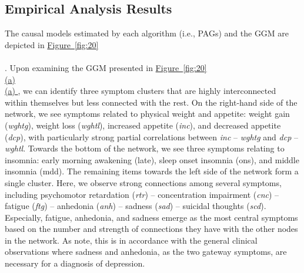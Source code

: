 \documentclass[twoside, 11pt]{article}
\newcommand*{\figref}[2][]{%
  \hyperref[{fig:#2}]{%
    Figure~\ref*{fig:#2}%
    \ifx\\#1\\%
    \else
      #1%
    \fi
  }%
}
\begin{document}
\subsection{Empirical Analysis Results} \label{empiricalresult}
The causal models estimated by each algorithm (i.e., PAGs) and the GGM are depicted in \figref[]{20}. Upon examining the GGM presented in \figref[(a)]{20}, we can identify three symptom clusters that are highly interconnected within themselves but less connected with the rest. On the right-hand side of the network, we see symptoms related to physical weight and appetite: weight gain (\textit{wghtg}), weight loss (\textit{wghtl}), increased appetite (\textit{inc}), and decreased appetite (\textit{dcp}), with particularly strong partial correlations between \textit{inc} -- \textit{wghtg} and \textit{dcp} -- \textit{wghtl}. Towards the bottom of the network, we see three symptoms relating to insomnia: early morning awakening (late), sleep onset insomnia (ons), and middle insomnia (mdd). The remaining items towards the left side of the network form a single cluster. Here, we observe strong connections among several symptoms, including psychomotor retardation (\textit{rtr}) -- concentration impairment (\textit{cnc}) -- fatigue (\textit{ftg}) -- anhedonia (\textit{anh}) -- sadness (\textit{sad}) -- suicidal thoughts (\textit{scd}). Especially, fatigue, anhedonia, and sadness emerge as the most central symptoms based on the number and strength of connections they have with the other nodes in the network. As \cite{mcnally_co-morbid_2017} note, this is in accordance with the general clinical observations where sadness and anhedonia, as the two gateway symptoms, are necessary for a diagnosis of depression. 
\end{document}
